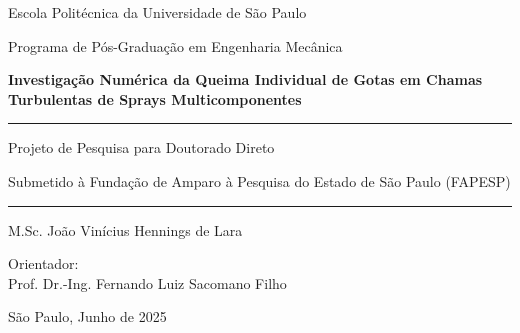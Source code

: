 \begin{titlepage}
    \centering
    \large
    {
    Escola Politécnica da Universidade de São Paulo \par
    Programa de Pós-Graduação em Engenharia Mecânica
    \par}

    \vspace*{6cm}
    
    {\bfseries\Large %
    Investigação Numérica da Queima Individual de Gotas em Chamas Turbulentas de Sprays Multicomponentes\par}
    
    \vspace{3cm}

    \hrule
    \vspace{0.4cm}
    {
    Projeto de Pesquisa para Doutorado Direto\par
    Submetido à Fundação de Amparo à Pesquisa do Estado de São Paulo (FAPESP)
    }    
    \vspace{0.4cm}
    \hrule
    
    \vspace{3cm}
    {
    M.Sc. João Vinícius Hennings de Lara\par
    }
    
    \vspace{1.5cm}
    {
    Orientador:\\ Prof. Dr.-Ing. Fernando Luiz Sacomano Filho
    }
    
    \vfill
    São Paulo, Junho de 2025

\end{titlepage}
